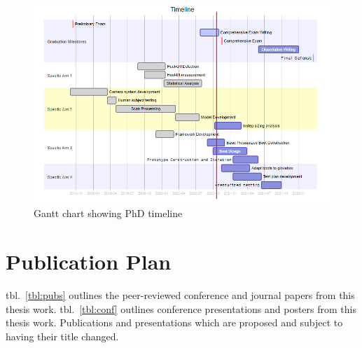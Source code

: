 \documentclass[defaultstyle,11pt]{comps}
\begin{document}
\begin{figure}
\hypertarget{fig:Gantt}{%
\centering
\includegraphics[width=1\textwidth,height=\textheight]{../fig/Gantt.png}
\caption{Gantt chart showing PhD timeline}\label{fig:Gantt}
}
\end{figure}

\hypertarget{publication-plan}{%
\section{Publication Plan}\label{publication-plan}}

tbl.~\ref{tbl:pubs} outlines the peer-reviewed conference and journal papers from this thesis work.
tbl.~\ref{tbl:conf} outlines conference presentations and posters from this thesis work.
Publications and presentations which are proposed and subject to having their title changed.
\end{document}
